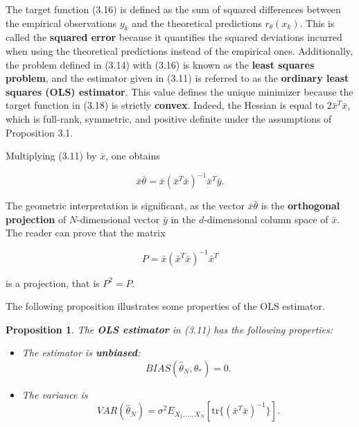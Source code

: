 \documentclass{report}
\newtheorem{proposition}{Proposition}[chapter]
\begin{document}
The target function (3.16) is defined as the sum of squared differences between the empirical observations $y_k$ and the theoretical predictions $r_\theta(x_k)$. This is called the \textbf{squared error} because it quantifies the squared deviations incurred when using the theoretical predictions instead of the empirical ones. Additionally, the problem defined in (3.14) with (3.16) is known as the \textbf{least squares problem}, and the estimator given in (3.11) is referred to as the \textbf{ordinary least squares (OLS) estimator}. This value defines the unique minimizer because the target function in (3.18) is strictly \textbf{convex}. Indeed, the Hessian is equal to $2\bar{x}^T\bar{x}$, which is full-rank, symmetric, and positive definite under the assumptions of Proposition 3.1.

Multiplying (3.11) by $\bar{x}$, one obtains

\begin{equation}
\bar{x}\bar{\theta} = \bar{x}(\bar{x}^T\bar{x})^{-1}\bar{x}^T\bar{y}.
\end{equation}

The geometric interpretation is significant, as the vector $\bar{x}\bar{\theta}$ is the \textbf{orthogonal projection} of $N$-dimensional vector $\bar{y}$ in the $d$-dimensional column space of $\bar{x}$. The reader can prove that the matrix

\begin{equation}
P = \bar{x}(\bar{x}^T\bar{x})^{-1}\bar{x}^T
\end{equation}

is a projection, that is $P^2 = P$.

The following proposition illustrates some properties of the OLS estimator.

\begin{proposition}
The \textbf{OLS estimator} in (3.11) has the following properties:

\begin{itemize}
\item The estimator is \textbf{unbiased}:
\begin{equation}
BIAS(\hat{\theta}_N, \theta_*) = 0.
\end{equation}
\item The variance is
\begin{equation}
VAR(\hat{\theta}_N) = \sigma^2 E_{X_1,\dots,X_N}[\mathrm{tr}\{(\bar{x}^T\bar{x})^{-1}\}].
\end{equation}
\end{itemize}
\end{proposition}
\end{document}
